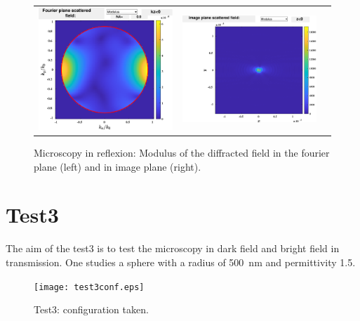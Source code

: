 \begin{figure}[H]
\begin{center}
\begin{tabular}{ccc}
  \includegraphics*[width=7.0cm,draft=false]{test2fourier.eps}
& \includegraphics*[width=7.0cm,draft=false]{test2image.eps}
\end{tabular}

\end{center}
\caption{Microscopy in reflexion: Modulus of the diffracted field in
  the fourier plane (left) and in image plane (right).}
\end{figure}




\section{Test3}

The aim of the test3 is to test the microscopy in dark field and
bright field in transmission. One studies a sphere with a radius of
500~nm and permittivity 1.5. 



\begin{figure}[H]
\begin{center}
  \texttt{[image: test3conf.eps]}
\end{center}
\caption{Test3: configuration taken.}
\label{test3conf}
\end{figure}


